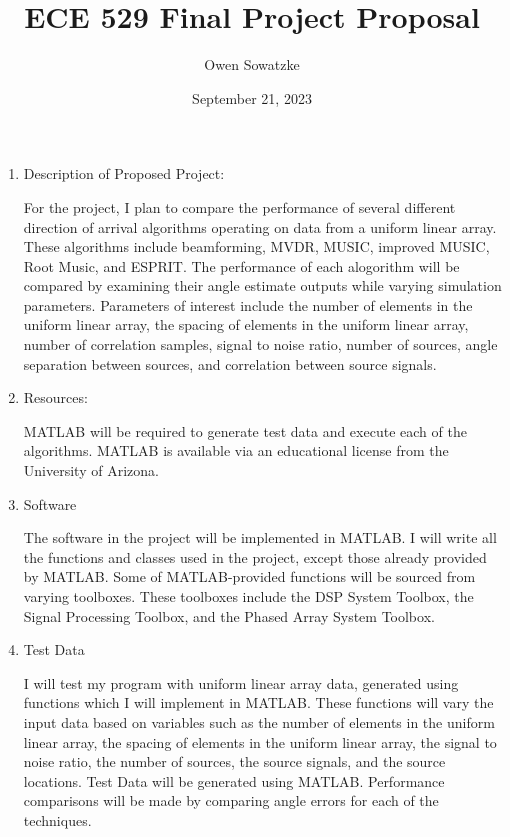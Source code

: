 \documentclass{article}
\title{ECE 529 Final Project Proposal}
\author{Owen Sowatzke}
\date{September 21, 2023}
\begin{document}
	\maketitle

	\begin{enumerate}
		\item Description of Proposed Project:
		
			For the project, I plan to compare the performance of several different direction of arrival algorithms operating on data from a uniform linear array. These algorithms include beamforming, MVDR, MUSIC, improved MUSIC, Root Music, and ESPRIT. The performance of each alogorithm will be compared by examining their angle estimate outputs while varying simulation parameters. Parameters of interest include the number of elements in the uniform linear array, the spacing of elements in the uniform linear array, number of correlation samples, signal to noise ratio, number of sources, angle separation between sources, and correlation between source signals. 
			
		\item Resources:
		
			MATLAB will be required to generate test data and execute each of the algorithms. MATLAB is available via an educational license from the University of Arizona.
			
		\item Software
		
			The software in the project will be implemented in MATLAB. I will write all the functions and classes used in the project, except those already provided by MATLAB. Some of MATLAB-provided functions will be sourced from varying toolboxes. These toolboxes include the DSP System Toolbox, the Signal Processing Toolbox, and the Phased Array System Toolbox.
			
		\item Test Data	
			
			I will test my program with uniform linear array data, generated using functions which I will implement in MATLAB. These functions will vary the input data based on variables such as the number of elements in the uniform linear array, the spacing of elements in the uniform linear array, the signal to noise ratio, the number of sources, the source signals, and the source locations. Test Data will be generated using MATLAB. Performance comparisons will be made by comparing angle errors for each of the techniques. 
	\end{enumerate}	
	
	\nocite{doa_algorithms_raghu}
	\nocite{mvdr_montlouis}
	\nocite{capon_sanudin}
	\nocite{music_chowdhury}
	\nocite{improved_music_gupta}
	\nocite{root_music_esprit_patwari}
	\nocite{esprit_ning}
	\newpage
	{}
	
\end{document}
